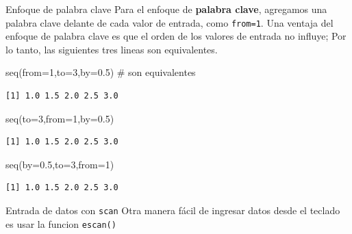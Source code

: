\documentclass[
  ignorenonframetext,
  aspectratio=169,
  spanish,
]{beamer}
\newenvironment{Shaded}{\begin{snugshade}}{\end{snugshade}}
\newcommand{\AttributeTok}[1]{\textcolor[rgb]{0.40,0.45,0.13}{#1}}
\newcommand{\CommentTok}[1]{\textcolor[rgb]{0.37,0.37,0.37}{#1}}
\newcommand{\DecValTok}[1]{\textcolor[rgb]{0.68,0.00,0.00}{#1}}
\newcommand{\FloatTok}[1]{\textcolor[rgb]{0.68,0.00,0.00}{#1}}
\newcommand{\FunctionTok}[1]{\textcolor[rgb]{0.28,0.35,0.67}{#1}}
\newcommand{\NormalTok}[1]{\textcolor[rgb]{0.00,0.23,0.31}{#1}}
\begin{document}
\begin{frame}[fragile]{Enfoque de palabra clave}
\label{enfoque-de-palabra-clave}
Para el enfoque de \textbf{palabra clave}, agregamos una palabra clave
delante de cada valor de entrada, como \texttt{from=1}. Una ventaja del
enfoque de palabra clave es que el orden de los valores de entrada no
influye; Por lo tanto, las siguientes tres lineas son equivalentes.

\begin{Shaded}
\begin{Highlighting}[]
\FunctionTok{seq}\NormalTok{(}\AttributeTok{from=}\DecValTok{1}\NormalTok{,}\AttributeTok{to=}\DecValTok{3}\NormalTok{,}\AttributeTok{by=}\FloatTok{0.5}\NormalTok{) }\CommentTok{\# son equivalentes }
\end{Highlighting}
\end{Shaded}

\begin{verbatim}
[1] 1.0 1.5 2.0 2.5 3.0
\end{verbatim}

\begin{Shaded}
\begin{Highlighting}[]
\FunctionTok{seq}\NormalTok{(}\AttributeTok{to=}\DecValTok{3}\NormalTok{,}\AttributeTok{from=}\DecValTok{1}\NormalTok{,}\AttributeTok{by=}\FloatTok{0.5}\NormalTok{)}
\end{Highlighting}
\end{Shaded}

\begin{verbatim}
[1] 1.0 1.5 2.0 2.5 3.0
\end{verbatim}

\begin{Shaded}
\begin{Highlighting}[]
\FunctionTok{seq}\NormalTok{(}\AttributeTok{by=}\FloatTok{0.5}\NormalTok{,}\AttributeTok{to=}\DecValTok{3}\NormalTok{,}\AttributeTok{from=}\DecValTok{1}\NormalTok{)}
\end{Highlighting}
\end{Shaded}

\begin{verbatim}
[1] 1.0 1.5 2.0 2.5 3.0
\end{verbatim}

\begin{block}{Entrada de datos con \texttt{scan}}
\label{entrada-de-datos-con-scan}
Otra manera fácil de ingresar datos desde el teclado es usar la funcion
\texttt{escan()}


\end{block}
\end{frame}
\end{document}

